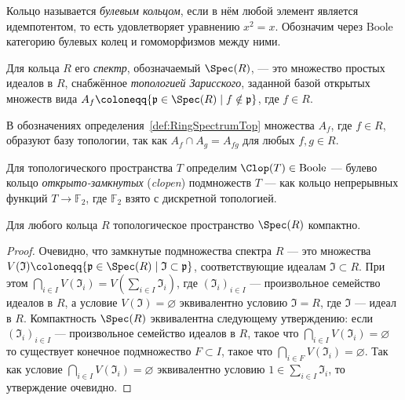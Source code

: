 \documentclass[
	extrafontsizes,
	11pt,
	hyphens,
]{memoir}
\begin{document}
\begin{definition}
Кольцо называется \emph{булевым кольцом}, если в нём любой элемент является идемпотентом, то есть удовлетворяет уравнению $x^2=x$.
Обозначим через $\mathrm{Boole}$ категорию булевых колец и гомоморфизмов между ними.
\end{definition}

\begin{definition}
\label{def:RingSpectrumTop}
Для кольца \(R\) его \emph{спектр}, обозначаемый \(\Spec(R)\), --- это множество простых идеалов в \(R\), снабжённое \emph{топологией Зарисского}, заданной базой открытых множеств вида \(A_f \coloneqq \{\mathfrak{p} \in \Spec(R) \mid f \notin \mathfrak{p}\}\), где \(f \in R\).
\end{definition}

\begin{remark}
В обозначениях определения~\ref{def:RingSpectrumTop} множества \(A_f\), где \(f \in R\), образуют базу топологии, так как \(A_f \cap A_g = A_{fg}\) для любых \(f, g \in R\).
\end{remark}

\begin{definition}
Для топологического пространства \(T\)
определим $\Clop(T) \in \mathrm{Boole}$ --- булево кольцо \emph{открыто-за\-мкну\-тых} (\emph{clopen}) подмножеств $T$ --- как кольцо непрерывных функций $T \to \mathbb{F}_2$, где $\mathbb{F}_2$ взято с дискретной топологией.
\end{definition}

\begin{theorem}
Для любого кольца \(R\) топологическое пространство \(\Spec(R)\) компактно.
\end{theorem}

\begin{proof}
Очевидно, что замкнутые подмножества спектра $R$ --- это множества
$V(\mathfrak{I}) \coloneqq \{\mathfrak{p} \in \Spec(R) \mid \mathfrak{I} \subset \mathfrak{p}\}$, соответствующие идеалам $\mathfrak{I} \subset R$.
При этом $\bigcap_{i \in I} V(\mathfrak{I}_i) = V(\sum_{i \in I} \mathfrak{I}_i)$, где $(\mathfrak{I}_i)_{i \in I}$ --- произвольное семейство идеалов в $R$, а условие \(V(\mathfrak{I}) = \varnothing\) эквивалентно условию $\mathfrak{I} = R$, где $\mathfrak{I}$ --- идеал в $R$.
Компактность $\Spec(R)$ эквивалентна следующему утверждению: если $(\mathfrak{I}_i)_{i \in I}$ --- произвольное семейство идеалов в $R$, такое что
$\bigcap_{i \in I} V(\mathfrak{I}_i) = \varnothing$ то существует конечное подмножество $F \subset I$, такое что
$\bigcap_{i \in F} V(\mathfrak{I}_i) = \varnothing$.
Так как условие \(\bigcap_{i \in I} V(\mathfrak{I}_i) = \varnothing\) эквивалентно условию \(1 \in \sum_{i \in I} \mathfrak{I}_i\), то утверждение очевидно.
\end{proof}
\end{document}
